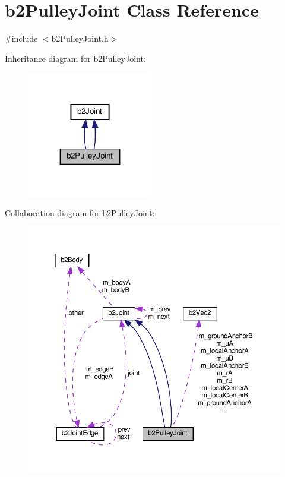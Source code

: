 \hypertarget{classb2PulleyJoint}{}\section{b2\+Pulley\+Joint Class Reference}
\label{classb2PulleyJoint}


{\ttfamily \#include $<$b2\+Pulley\+Joint.\+h$>$}



Inheritance diagram for b2\+Pulley\+Joint\+:
\nopagebreak
\begin{figure}[H]
\begin{center}
\leavevmode
\includegraphics[width=155pt]{classb2PulleyJoint__inherit__graph}
\end{center}
\end{figure}


Collaboration diagram for b2\+Pulley\+Joint\+:
\nopagebreak
\begin{figure}[H]
\begin{center}
\leavevmode
\includegraphics[width=350pt]{classb2PulleyJoint__coll__graph}
\end{center}
\end{figure}
